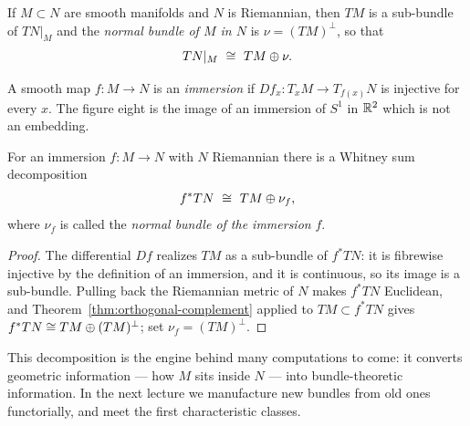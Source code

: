 \begin{example}\label{ex:normal-bundle}
If $M\subset N$ are smooth manifolds and $N$ is Riemannian, then $TM$ is a
sub-bundle of $TN|_M$ and the \emph{normal bundle of $M$ in $N$} is
$\nu=(TM)^\perp$, so that
\[
TN|_M\ \cong\ TM\oplus\nu .
\]

\begin{center}
\end{center}
\end{example}

\begin{definition}
A smooth map $f\colon M\to N$ is an \emph{immersion} if
$Df_x\colon T_xM\to T_{f(x)}N$ is injective for every $x$. The figure eight is
the image of an immersion of $S^1$ in $\mathbb{R}^2$ which is not an embedding.
\end{definition}

\begin{lemma}\label{lem:normal-immersion}
For an immersion $f\colon M\to N$ with $N$ Riemannian there is a Whitney sum
decomposition
\[
f^*TN\ \cong\ TM\oplus\nu_f,
\]
where $\nu_f$ is called the \emph{normal bundle of the immersion} $f$.
\end{lemma}

\begin{proof}
The differential $Df$ realizes $TM$ as a sub-bundle of $f^*TN$: it is fibrewise
injective by the definition of an immersion, and it is continuous, so its image
is a sub-bundle. Pulling back the Riemannian metric of $N$ makes $f^*TN$
Euclidean, and Theorem~\ref{thm:orthogonal-complement} applied to
$TM\subset f^*TN$ gives $f^*TN\cong TM\oplus(TM)^\perp$; set $\nu_f=(TM)^\perp$.
\end{proof}

This decomposition is the engine behind many computations to come: it converts
geometric information --- how $M$ sits inside $N$ --- into bundle-theoretic
information. In the next lecture we manufacture new bundles from old ones
functorially, and meet the first characteristic classes.
